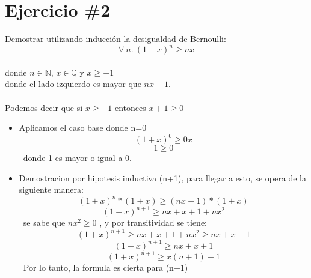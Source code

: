 \documentclass{article}
\begin{document}
\section*{Ejercicio \#2}
Demostrar utilizando inducci\'on la desigualdad de Bernoulli:
\[
        \forall\ n.\ (1+x)^n\geq nx
\]
\\donde $n\in \mathbb{N}$, $x\in \mathbb{Q}$ y $x\geq -1$
\\
donde el lado izquierdo es mayor que $nx + 1$. 
\\
\\Podemos decir que si $x \geq -1$ entonces $x+1 \geq 0$ 
\\
\begin{itemize}
\item Aplicamos el caso base donde n=0
\[ (1+x)^0 \geq 0x\]
\[ 1 \geq 0 \]
\ donde 1 es mayor o igual a 0.
\\ 
\item Demostracion por hipotesis inductiva (n+1), para llegar a esto, se opera de la siguiente manera: 
\[ (1+x)^n * (1+x) \geq (nx+1)* (1+x) \]
\[ (1+x)^{n+1} \geq nx+x+1+nx^2 \]
\ se sabe que $nx^2 \geq 0$ , y por transitividad se tiene:
\[ (1+x)^{n+1} \geq nx+x+1+nx^2 \geq nx+x+1\] 
 \[ (1+x)^{n+1} \geq nx+x+1\]
\[ (1+x)^{n+1} \geq x(n+1)+1 \]
\ Por lo tanto, la formula es cierta para (n+1)



\end{itemize}

% 
% 
\end{document}

